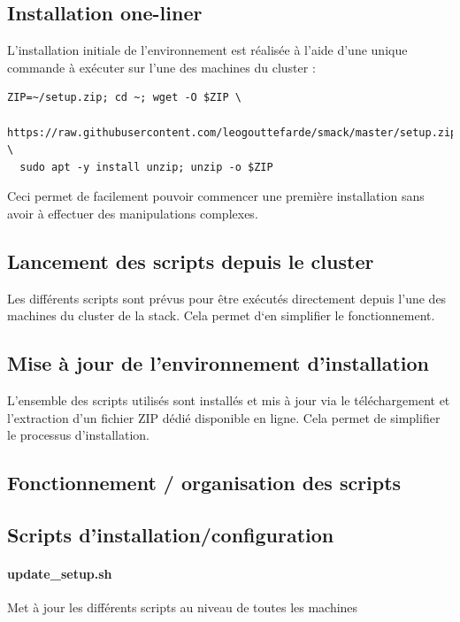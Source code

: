 \documentclass[a4paper, 11pt, titlepage]{article}
\begin{document}
\subsection {Installation one-liner}

L'installation initiale de l'environnement est réalisée à l'aide d'une unique commande à exécuter sur l'une des machines du cluster :

\begin{verbatim}
ZIP=~/setup.zip; cd ~; wget -O $ZIP \
  https://raw.githubusercontent.com/leogouttefarde/smack/master/setup.zip; \
  sudo apt -y install unzip; unzip -o $ZIP
\end{verbatim}

Ceci permet de facilement pouvoir commencer une première installation sans avoir à effectuer des manipulations complexes.


\subsection {Lancement des scripts depuis le cluster}

Les différents scripts sont prévus pour être exécutés directement depuis l'une des machines du cluster de la stack. Cela permet d‘en simplifier le fonctionnement.


\subsection {Mise à jour de l'environnement d'installation}

L'ensemble des scripts utilisés sont installés et mis à jour via le téléchargement et l'extraction d'un fichier ZIP dédié disponible en ligne. Cela permet de simplifier le processus d'installation.


\subsection {Fonctionnement / organisation des scripts}

\subsection{Scripts d'installation/configuration}

\paragraph{update\_setup.sh}

Met à jour les différents scripts au niveau de toutes les machines
\end{document}
